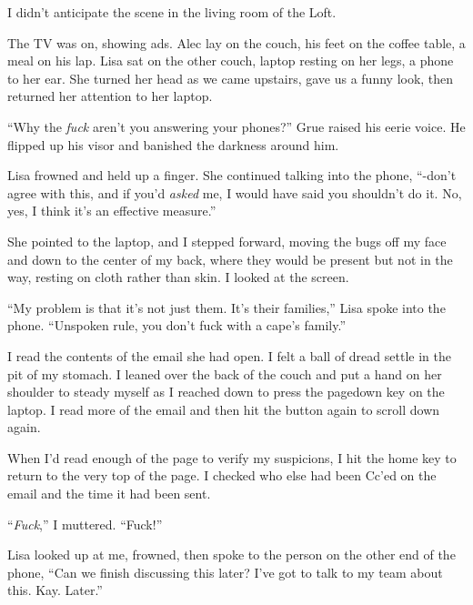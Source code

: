 I didn't anticipate the scene in the living room of the Loft.



The TV was on, showing ads.  Alec lay on the couch, his feet on the coffee table, a meal on his lap.  Lisa sat on the other couch, laptop resting on her legs, a phone to her ear.  She turned her head as we came upstairs, gave us a funny look, then returned her attention to her laptop.



``Why the \emph{fuck} aren't you answering your phones?'' Grue raised his eerie voice.  He flipped up his visor and banished the darkness around him.



Lisa frowned and held up a finger.  She continued talking into the phone, ``-don't agree with this, and if you'd \emph{asked} me, I would have said you shouldn't do it.  No, yes, I think it's an effective measure.''



She pointed to the laptop, and I stepped forward, moving the bugs off my face and down to the center of my back, where they would be present but not in the way, resting on cloth rather than skin.  I looked at the screen.



``My problem is that it's not just them.  It's their families,'' Lisa spoke into the phone.  ``Unspoken rule, you don't fuck with a cape's family.''



I read the contents of the email she had open.  I felt a ball of dread settle in the pit of my stomach.  I leaned over the back of the couch and put a hand on her shoulder to steady myself as I reached down to press the pagedown key on the laptop.  I read more of the email and then hit the button again to scroll down again.



When I'd read enough of the page to verify my suspicions, I hit the home key to return to the very top of the page.  I checked who else had been Cc'ed on the email and the time it had been sent.



``\emph{Fuck},'' I muttered.  ``Fuck!''



Lisa looked up at me, frowned, then spoke to the person on the other end of the phone, ``Can we finish discussing this later?  I've got to talk to my team about this.  Kay.  Later.''



